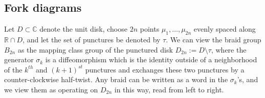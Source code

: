 \documentclass[11pt]{article}
\theoremstyle{plain} \newtheorem{thm}{Theorem}[subsection]
\theoremstyle{plain} \newtheorem{cor}[thm]{Corollary}
\theoremstyle{plain} \newtheorem{prop}[thm]{Proposition}
\theoremstyle{plain} \newtheorem{conj}[thm]{Conjecture}
\theoremstyle{plain} \newtheorem{lem}[thm]{Lemma}
\theoremstyle{definition} \newtheorem{df}[thm]{Definition}
\theoremstyle{remark} \newtheorem{rmk}[thm]{Remark}
\theoremstyle{remark} \newtheorem{obs}[thm]{Observation}
\newcommand{\B}[1]{B_{#1} }
\numberwithin{equation}{section}
\begin{document}
\subsection{Fork diagrams}\label{sec:fork}
Let $D \subset \mathbb{C}$ denote the unit disk, choose $2n$ points $\mu_{1} , \ldots, \mu_{2n}$ evenly spaced along $\mathbb{R} \cap D$, and let the set of punctures be denoted by $\tau$.  We can view the braid group $\B{2n}$ as the mapping class group of the punctured disk $D_{2n}:=D \setminus \tau$, where the generator $\sigma_{k}$ is a diffeomorphism which is the identity outside of a neighborhood of the $k^{th}$ and $(k+1)^{st}$ punctures and exchanges these two punctures by a counter-clockwise half-twist.  Any braid can be written as a word in the $\sigma_{k}$'s, and we view them as operating on $D_{2n}$ in this way, read from left to right.

\end{document}
